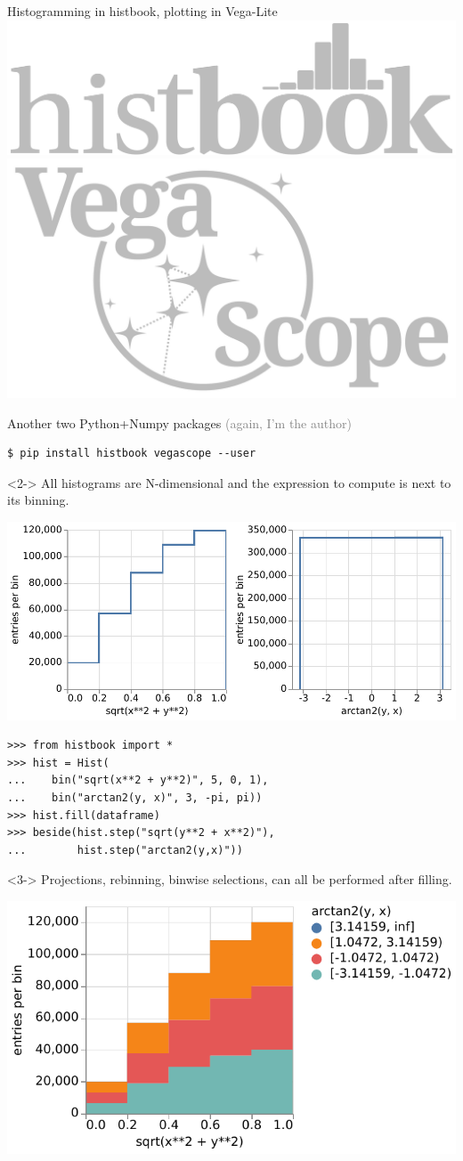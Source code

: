 \documentclass[aspectratio=169]{beamer}
\begin{document}
\begin{frame}[fragile]{Histogramming in histbook, plotting in Vega-Lite}
\normalsize
\vspace{0.5 cm}
\hfill \includegraphics[height=0.8 cm]{histbook-logo.pdf}\mbox{\includegraphics[height=0.8 cm]{vegascope-logo.pdf}\hspace{-0.75 cm}}

\vspace{-0.9 cm}
Another two Python+Numpy packages \textcolor{gray}{(again, I'm the author)}

\scriptsize
\begin{verbatim}
$ pip install histbook vegascope --user
\end{verbatim}
\normalsize

\begin{uncoverenv}<2->
All histograms are N-dimensional and the expression to compute is next to its binning.

\vspace{0.2 cm}
\hfill \includegraphics[height=2.3 cm]{histbook-beside.pdf}

\vspace{-2.5 cm}
\scriptsize
\begin{verbatim}
>>> from histbook import *
>>> hist = Hist(
...    bin("sqrt(x**2 + y**2)", 5, 0, 1),
...    bin("arctan2(y, x)", 3, -pi, pi))
>>> hist.fill(dataframe)
>>> beside(hist.step("sqrt(y**2 + x**2)"),
...        hist.step("arctan2(y,x)"))
\end{verbatim}
\normalsize
\end{uncoverenv}

\begin{uncoverenv}<3->
Projections, rebinning, binwise selections, can all be performed after filling.

\vspace{0.2 cm}
\hfill \includegraphics[height=2.3 cm]{histbook-stack.pdf}


\end{uncoverenv}
\end{frame}
\end{document}
